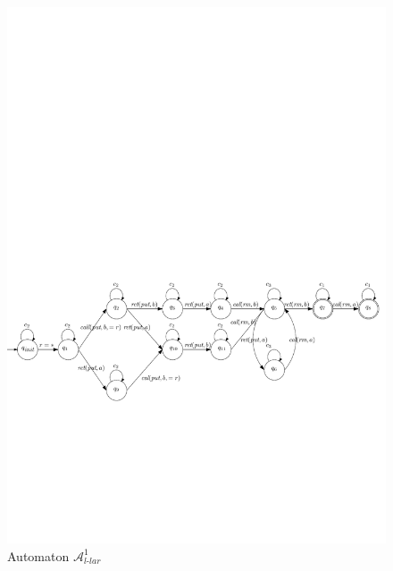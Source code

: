 \begin{figure}[htbp]
  \centering
  \includegraphics[width=1 \textwidth]{figures/PIC_AUTO_PQ1Lar-pprr.pdf}
  \caption{Automaton $\mathcal{A}_{\textit{l-lar}}^1$}
  \label{fig:automata APQ1Lar-1 in paper}
\end{figure}

